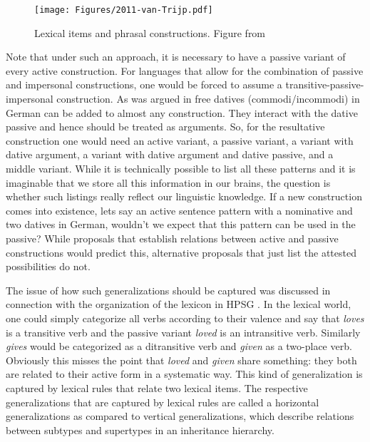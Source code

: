 \begin{figure}
\texttt{[image: Figures/2011-van-Trijp.pdf]}
\caption{\label{fig-as-trijp}Lexical items and phrasal constructions. Figure %
from }
\end{figure}%

Note that under such an approach, it is necessary to have a passive variant of every active
construction. For languages that allow for the combination of passive and impersonal constructions,
one would be forced to assume a transitive-passive-impersonal construction. As was argued in
 free datives (commodi/incommodi) in German can be added to almost
any construction. They interact with the dative passive and hence should be treated as
arguments. So, for the resultative construction one would need an active variant, a passive variant,
a variant with dative argument, a variant with dative argument and dative passive, and a middle variant.
While it is technically possible to list all these patterns and it is imaginable that we store all
this information in our brains, the question is whether such listings really reflect our linguistic
knowledge. If a new construction comes into existence, lets say an active sentence pattern with a
nominative and two datives in German, wouldn't we expect that this pattern can be used in the
passive? While proposals that establish relations between active and passive constructions would
predict this, alternative proposals that just list the attested possibilities do not.

The issue of how such generalizations should be captured was discussed in connection with the
organization of the lexicon in HPSG \citep{Flickinger87,Meurers2001a}. In the lexical world, one could simply categorize all verbs according to their
valence and say that \emph{loves} is a transitive verb and the passive variant \emph{loved} is an
intransitive verb. Similarly \emph{gives} would be categorized as a ditransitive verb and
\emph{given} as a two-place verb. Obviously this misses the point that \emph{loved} and \emph{given}
share something: they both are related to their active form in a systematic way. This kind of
generalization is captured by lexical rules that relate two lexical items. The respective
generalizations that are captured by lexical rules are called a horizontal generalizations as compared to vertical generalizations, which
describe relations between subtypes and supertypes in an inheritance hierarchy.

